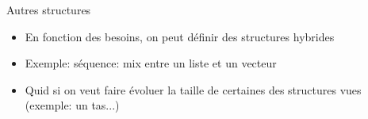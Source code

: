 \begin{frame}{Autres structures}

\begin{itemize}
\item En fonction des besoins, on peut définir des structures hybrides
\item Exemple: séquence: mix entre un liste et un vecteur
\item Quid si on veut faire évoluer la taille de certaines des structures vues (exemple: un tas...)
\end{itemize}

\end{frame}
